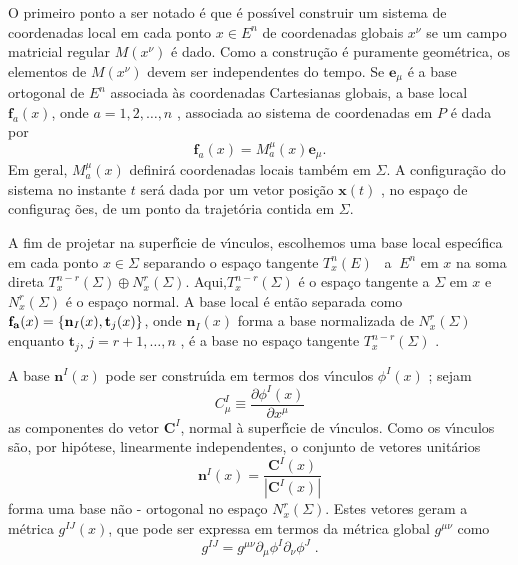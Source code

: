 \documentclass[a4paper,thmsa,12pt]{report}
\begin{document}
O primeiro ponto a ser notado \'{e} que \'{e} poss\'{\i}vel construir um
sistema de coordenadas local em cada ponto $x\in E^{n}$ de coordenadas
globais $x^{\nu }$ se um campo matricial regular $M(x^{\nu })$ \'{e} dado.
Como a constru\c{c}\~{a}o \'{e} puramente geom\'{e}trica, os elementos de $%
M(x^{\nu })$ devem ser independentes do tempo. Se $\mathbf{e}_{\mu }$ \'{e} a 
base ortogonal de $E^{n}$ associada \`{a}s
coordenadas Cartesianas globais, a base local $\mathbf{f}_{a}(x)$, onde $%
a=1,2,\ldots ,n$ , associada ao sistema de coordenadas em $P$ \'{e} dada por 
\begin{equation}
\mathbf{f}_{a}(x)=M_{a}^{\mu }(x)\mathbf{e}_{\mu }.  \label{2}
\end{equation}
Em geral, $M_{a}^{\mu }(x)$ definir\'{a} coordenadas locais tamb\'{e}m em $%
\Sigma $. A configura\c{c}\~{a}o do sistema no instante $t$ ser\'{a} dada
por um vetor posi\c{c}\~{a}o $\mathbf{x}(t)$ , no espa\c{c}o de configura\c{c%
}\~{o}es, de um ponto da trajet\'{o}ria contida em $\Sigma $.

A fim de projetar na superf\'{\i}cie de v\'{\i}nculos, escolhemos uma base
local espec\'{\i}fica em cada ponto $x\in \Sigma $ separando o espa\c{c}o
tangente $T_{x}^{n}(E)$ \ a $\ E^{n}$ em $x$ na soma direta $%
T_{x}^{n-r}(\Sigma )\oplus N_{x}^{r}(\Sigma )$. Aqui,$T_{x}^{n-r}(\Sigma )$
\'{e} o espa\c{c}o tangente a $\Sigma $ em $x$ e $N_{x}^{r}(\Sigma )$ \'{e}
o espa\c{c}o normal. A base local \'{e} ent\~{a}o separada como $\mathbf{%
f_{a}}(x)=\{\mathbf{n}_{I}(x),\mathbf{t}_{j}(x)\}$, onde $\mathbf{n}_{I}(x)$
forma a base normalizada de $N_{x}^{r}(\Sigma )$ enquanto $\mathbf{t}_{j}$, $%
j=r+1,\ldots ,n$ , \'{e} a base no espa\c{c}o tangente $T_{x}^{n-r}(\Sigma )$%
.

A base $\mathbf{n}^{I}(x)$ pode ser constru\'{\i}da em termos dos
v\'{\i}nculos $\phi ^{I}(x)$ ; sejam 
\begin{equation}
C_{\mu }^{I}\equiv \frac{\partial \phi ^{I}(x)}{\partial x^{\mu }}  \label{3}
\end{equation}
as componentes do vetor $\mathbf{C}^{I}$, normal \`{a} superf\'{\i}cie de
v\'{\i}nculos. Como os v\'{\i}nculos s\~{a}o, por hip\'{o}tese, linearmente
independentes, o conjunto de vetores unit\'{a}rios 
\begin{equation}
\mathbf{n}^{I}(x)=\frac{\mathbf{C}^{I}\left( x\right) }{\left| \mathbf{C}%
^{I}\left( x\right) \right| }  \label{4}
\end{equation}
forma uma base n\~{a}o - ortogonal no espa\c{c}o $N_{x}^{r}(\Sigma ).$ Estes
vetores geram a m\'{e}trica $g^{IJ}(x)$, que pode ser expressa em termos da
m\'{e}trica global $g^{\mu \nu }$ como 
\begin{equation}
g^{IJ}=g^{\mu \nu }\partial _{\mu }\phi ^{I}\partial _{\nu }\phi ^{J}\;.
\label{5}
\end{equation}
\end{document}
